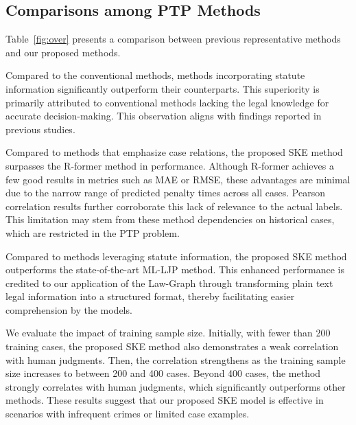 
\subsection{Comparisons among PTP Methods}

Table~\ref{fig:over} presents a comparison between previous representative methods and our proposed methods. 

Compared to the conventional methods, methods incorporating statute information significantly outperform their counterparts. This superiority is primarily attributed to conventional methods lacking the legal knowledge for accurate decision-making. This observation aligns with findings reported in previous studies.

Compared to methods that emphasize case relations, the proposed SKE method surpasses the R-former method in performance. Although R-former achieves a few good results in metrics such as MAE or RMSE, these advantages are minimal due to the narrow range of predicted penalty times across all cases. Pearson correlation results further corroborate this lack of relevance to the actual labels. This limitation may stem from these method dependencies on historical cases, which are restricted in the PTP problem.

Compared to methods leveraging statute information, the proposed SKE method outperforms the state-of-the-art ML-LJP method. This enhanced performance is credited to our application of the Law-Graph through transforming plain text legal information into a structured format, thereby facilitating easier comprehension by the models.

We evaluate the impact of training sample size. Initially, with fewer than 200 training cases, the proposed SKE method also demonstrates a weak correlation with human judgments. Then, the correlation strengthens as the training sample size increases to between 200 and 400 cases. Beyond 400 cases, the method strongly correlates with human judgments, which significantly outperforms other methods. These results suggest that our proposed SKE model is effective in scenarios with infrequent crimes or limited case examples.



